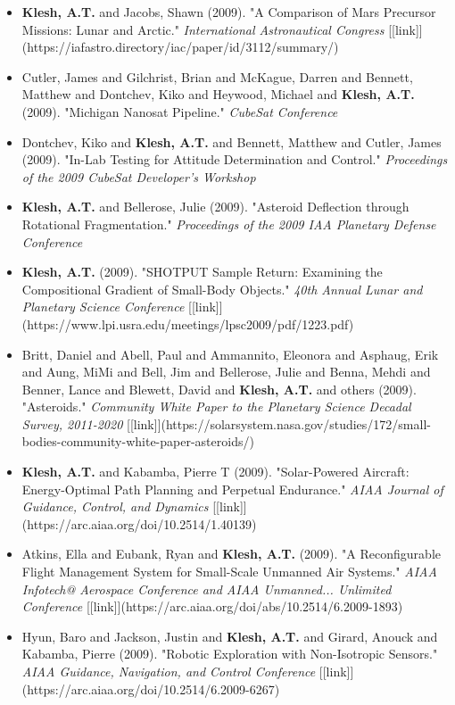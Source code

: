 \documentclass[11pt,letterpaper]{article}
\begin{document}
\begin{itemize}
\item \textbf{Klesh, A.T.} and Jacobs, Shawn (2009). "A Comparison of Mars Precursor Missions: Lunar and Arctic." \textit{International Astronautical Congress} [[link]](https://iafastro.directory/iac/paper/id/3112/summary/)
\item Cutler, James and Gilchrist, Brian and McKague, Darren and Bennett, Matthew and Dontchev, Kiko and Heywood, Michael and \textbf{Klesh, A.T.} (2009). "Michigan Nanosat Pipeline." \textit{CubeSat Conference}
\item Dontchev, Kiko and \textbf{Klesh, A.T.} and Bennett, Matthew and Cutler, James (2009). "In-Lab Testing for Attitude Determination and Control." \textit{Proceedings of the 2009 CubeSat Developer's Workshop}
\item \textbf{Klesh, A.T.} and Bellerose, Julie (2009). "Asteroid Deflection through Rotational Fragmentation." \textit{Proceedings of the 2009 IAA Planetary Defense Conference}
\item \textbf{Klesh, A.T.} (2009). "SHOTPUT Sample Return: Examining the Compositional Gradient of Small-Body Objects." \textit{40th Annual Lunar and Planetary Science Conference} [[link]](https://www.lpi.usra.edu/meetings/lpsc2009/pdf/1223.pdf)
\item Britt, Daniel and Abell, Paul and Ammannito, Eleonora and Asphaug, Erik and Aung, MiMi and Bell, Jim and Bellerose, Julie and Benna, Mehdi and Benner, Lance and Blewett, David and \textbf{Klesh, A.T.} and others (2009). "Asteroids." \textit{Community White Paper to the Planetary Science Decadal Survey, 2011-2020} [[link]](https://solarsystem.nasa.gov/studies/172/small-bodies-community-white-paper-asteroids/)
\item \textbf{Klesh, A.T.} and Kabamba, Pierre T (2009). "Solar-Powered Aircraft: Energy-Optimal Path Planning and Perpetual Endurance." \textit{AIAA Journal of Guidance, Control, and Dynamics} [[link]](https://arc.aiaa.org/doi/10.2514/1.40139)
\item Atkins, Ella and Eubank, Ryan and \textbf{Klesh, A.T.} (2009). "A Reconfigurable Flight Management System for Small-Scale Unmanned Air Systems." \textit{AIAA Infotech@ Aerospace Conference and AIAA Unmanned... Unlimited Conference} [[link]](https://arc.aiaa.org/doi/abs/10.2514/6.2009-1893)
\item Hyun, Baro and Jackson, Justin and \textbf{Klesh, A.T.} and Girard, Anouck and Kabamba, Pierre (2009). "Robotic Exploration with Non-Isotropic Sensors." \textit{AIAA Guidance, Navigation, and Control Conference} [[link]](https://arc.aiaa.org/doi/10.2514/6.2009-6267)

\end{itemize}
\end{document}
